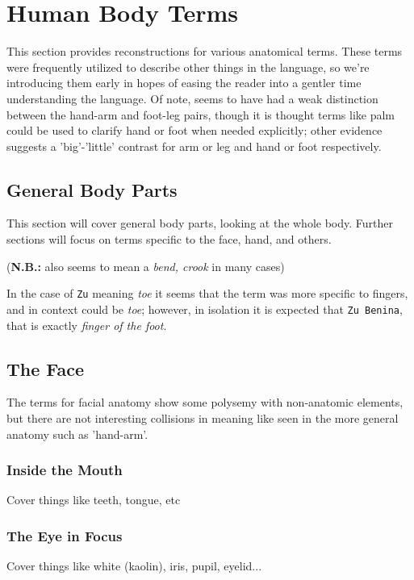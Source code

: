 \section{Human Body Terms}
This section provides reconstructions for various \langname anatomical terms. These terms were frequently utilized to describe other things in the language, so we're introducing them early in hopes of easing the reader into a gentler time understanding the language. Of note, \langname seems to have had a weak distinction between the hand-arm and foot-leg pairs, though it is thought terms like palm could be used to clarify hand or foot when needed explicitly; other evidence suggests a 'big'-'little' contrast for arm or leg and hand or foot respectively.
  \subsection{General Body Parts}
  This section will cover general body parts, looking at the whole body. Further sections will focus on terms specific to the face, hand, and others.\par
  \begin{itemize}
     (\textbf{N.B.:} also seems to mean a \textit{bend, crook} in many cases)
  \end{itemize}\par
  In the case of \texttt{Zu} meaning \textit{toe} it seems that the term was more specific to fingers, and in context could be \textit{toe}; however, in isolation it is expected that \texttt{Zu Benina}, that is exactly \textit{finger of the foot}.\par
  \subsection{The Face}
  The terms for facial anatomy show some polysemy with non-anatomic elements, but there are not interesting collisions in meaning like seen in the more general anatomy such as 'hand-arm'.\par
  \begin{itemize}
  \end{itemize}\par
    \subsubsection{Inside the Mouth}
    Cover things like teeth, tongue, etc
    \subsubsection{The Eye in Focus}
    Cover things like white (kaolin), iris, pupil, eyelid...

